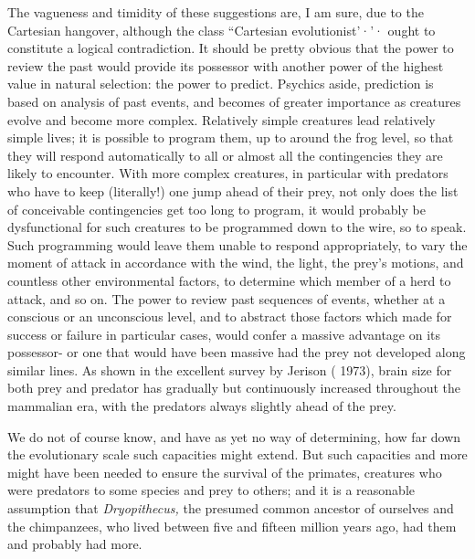 The vagueness and timidity of these suggestions are, I am sure, due to the Cartesian hangover, although the class ``Cartesian evolution\-ist'·'· ought to constitute a logical contradiction. It should be pretty
obvious that the power to review the past would provide its possessor with another power of the highest value in natural selection: the power to predict. Psychics aside, prediction is based on analysis of past events, and becomes of greater importance as creatures evolve and become more complex. Relatively simple creatures lead relatively simple lives; it is possible to program them, up to around the frog level, so that they will respond automatically to all or almost all the contingencies they are likely to encounter. With more complex crea\-tures, in particular with predators who have to keep (literally!) one jump ahead of their prey, not only does the list of conceivable contin\-gencies get too long to program, it would probably be dysfunctional for such creatures to be programmed down to the wire, so to speak. Such programming would leave them unable to respond appropriately, to vary the moment of attack in accordance with the wind, the light, the prey's motions, and countless other environmental factors, to determine which member of a herd to attack, and so on. The power to review past sequences of events, whether at a conscious or an un\-conscious level, and to abstract those factors which made for success or failure in particular cases, would confer a massive advantage on its possessor- or one that would have been massive had the prey not de\-veloped along similar lines. As shown in the excellent survey by Jerison ( 1973), brain size for both prey and predator has gradually but con\-tinuously increased throughout the mammalian era, with the predators always slightly ahead of the prey.

We do not of course know, and have as yet no way of determin\-ing, how far down the evolutionary scale such capacities might extend. But such capacities and more might have been needed to ensure the survival of the primates, creatures who were predators to some species and prey to others; and it is a reasonable assumption that \textit{Dryopithecus,} the presumed common ancestor of ourselves and the chimpanzees, who lived between five and fifteen million years ago, had them and probably had more.

